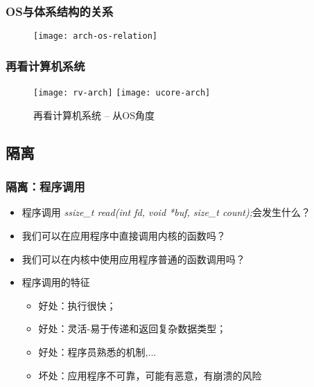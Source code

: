
\begin{frame}
    
    \frametitle{OS与体系结构的关系}
    
    \begin{figure}
        \centering
        \texttt{[image: arch-os-relation]}
    \end{figure}
    
\end{frame}

\begin{frame}
    
    \frametitle{再看计算机系统}
    
    \begin{figure}
        \centering
        \texttt{[image: rv-arch]}
        \texttt{[image: ucore-arch]}	
        \caption{再看计算机系统 -- 从OS角度}
    \end{figure}
    
    
\end{frame}

\subsection{隔离} %


\begin{frame}
	\frametitle{隔离：\small{程序调用}}
	\begin{itemize}
		\item 程序调用 \textit{ssize\_t read(int fd, void *buf, size\_t count);}会发生什么？
		\item 我们可以在应用程序中直接调用内核的函数吗？
		\item 我们可以在内核中使用应用程序普通的函数调用吗？ \pause
		\item 程序调用的特征
		\begin{itemize}
			\item 好处：执行很快；
			\item 好处：灵活-易于传递和返回复杂数据类型；
			\item 好处：程序员熟悉的机制,...
			\item 坏处：应用程序不可靠，可能有恶意，有崩溃的风险
			
		\end{itemize}
	\end{itemize}
\end{frame}



